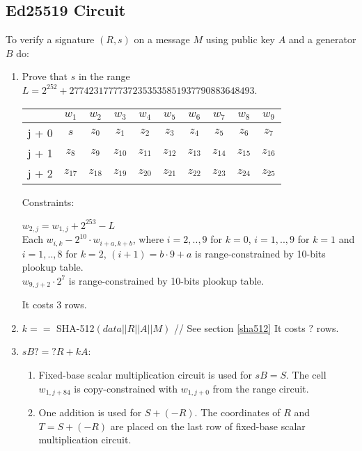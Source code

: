 \subsection{Ed25519 Circuit}
\label{section:eddsa}

To verify a signature $(R,s)$ on a message $M$ using public key $A$ and a generator $B$ do:
\begin{enumerate}
    \item Prove that $s$ in the range $L = 2^{252}+27742317777372353535851937790883648493$.
        \begin{center}
    \begin{tabular}{ c|c|c|c|c|c|c|c|c|c }
        & $w_1$  & $w_2$  & $w_3$  & $w_4$  & $w_5$  & $w_6$ & $w_7$ & $w_8$ & $w_9$  \\
            \hline
                j + 0 & $s$ & $z_0$ & $z_1$ & $z_2$ & $z_3$ & $z_4$ & $z_5$ & $z_6$ & $z_7$ \\
                j + 1 & $z_8$ & $z_{9}$ & $z_{10}$ & $z_{11}$ & $z_{12}$ & $z_{13}$ & $z_{14}$ & $z_{15}$ & $z_{16}$ \\
                j + 2 & $z_{17}$ & $z_{18}$ & $z_{19}$ & $z_{20}$ & $z_{21}$ & $z_{22}$ & $z_{23}$ & $z_{24}$ & $z_{25}$ \\
            \end{tabular}
        \end{center}
        Constraints:
        \begin{center}
            $w_{2, j} = w_{1,j} + 2^{253} - L $ \\
            Each $w_{i,k} - 2^{10} \cdot w_{i + a, k + b} $, where $i = 2,..,9$ for $k = 0$, $i = 1,..,9$ for $k = 1$ and $i = 1,..,8$ for $k = 2$, $(i + 1) = b \cdot 9 + a$  is range-constrained by 10-bits plookup table. \\
            $w_{9,j+2} \cdot 2^7 $ is range-constrained by 10-bits plookup table.
        \end{center}
	It costs $3$ rows.
    \item $k ==$ SHA-512$(data||R||A||M)$ // See section \ref{sha512}
    It costs $?$ rows.
    \item $sB ?=? R + kA$:
        \begin{enumerate}
            \item Fixed-base scalar multiplication circuit is used for $sB = S$. The cell $w_{1, j + 84}$ is copy-constrained with $w_{1, j + 0}$ from the range circuit.
            \item One addition is used for $S + (-R)$. The coordinates of $R$ and $T = S + (-R)$ are placed on the last row of fixed-base scalar multiplication circuit.

\end{enumerate}
\end{enumerate}
